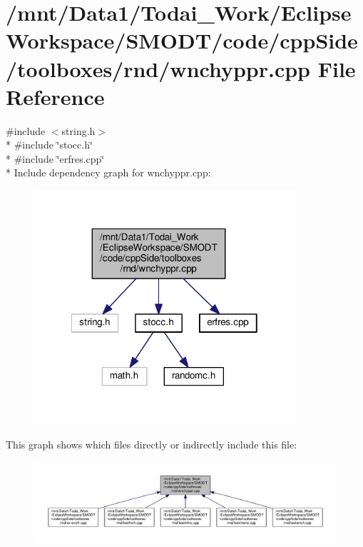 \section{/mnt/\-Data1/\-Todai\-\_\-\-Work/\-Eclipse\-Workspace/\-S\-M\-O\-D\-T/code/cpp\-Side/toolboxes/rnd/wnchyppr.cpp File Reference}
\label{toolboxes_2rnd_2wnchyppr_8cpp}
{\ttfamily \#include $<$string.\-h$>$}\\*
{\ttfamily \#include \char`\"{}stocc.\-h\char`\"{}}\\*
{\ttfamily \#include \char`\"{}erfres.\-cpp\char`\"{}}\\*
Include dependency graph for wnchyppr.\-cpp\-:
\nopagebreak
\begin{figure}[H]
\begin{center}
\leavevmode
\includegraphics[width=274pt]{toolboxes_2rnd_2wnchyppr_8cpp__incl}
\end{center}
\end{figure}
This graph shows which files directly or indirectly include this file\-:
\nopagebreak
\begin{figure}[H]
\begin{center}
\leavevmode
\includegraphics[width=350pt]{toolboxes_2rnd_2wnchyppr_8cpp__dep__incl}
\end{center}
\end{figure}
